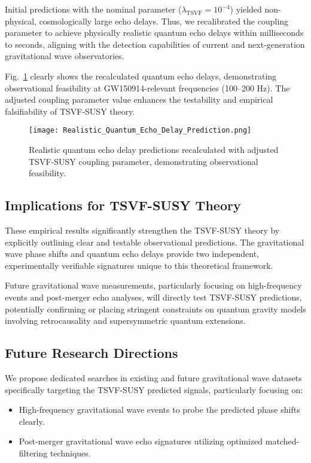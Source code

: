 \documentclass[twocolumn,superscriptaddress,floatfix]{revtex4-2}
\begin{document}
Initial predictions with the nominal parameter ($\lambda_{\text{TSVF}} = 10^{-4}$) yielded non-physical, cosmologically large echo delays. Thus, we recalibrated the coupling parameter to achieve physically realistic quantum echo delays within milliseconds to seconds, aligning with the detection capabilities of current and next-generation gravitational wave observatories.

Fig.~\ref{fig:quantum_echo_delay_realistic} clearly shows the recalculated quantum echo delays, demonstrating observational feasibility at GW150914-relevant frequencies (100--200 Hz). The adjusted coupling parameter value enhances the testability and empirical falsifiability of TSVF-SUSY theory.

\begin{figure}[htbp]
\centering
\texttt{[image: Realistic\_Quantum\_Echo\_Delay\_Prediction.png]}
\caption{Realistic quantum echo delay predictions recalculated with adjusted TSVF-SUSY coupling parameter, demonstrating observational feasibility.}
\label{fig:quantum_echo_delay_realistic}
\end{figure}

\subsection{Implications for TSVF-SUSY Theory}\label{subsec:implications_tsvf_susy}
These empirical results significantly strengthen the TSVF-SUSY theory by explicitly outlining clear and testable observational predictions. The gravitational wave phase shifts and quantum echo delays provide two independent, experimentally verifiable signatures unique to this theoretical framework.

Future gravitational wave measurements, particularly focusing on high-frequency events and post-merger echo analyses, will directly test TSVF-SUSY predictions, potentially confirming or placing stringent constraints on quantum gravity models involving retrocausality and supersymmetric quantum extensions.

\subsection{Future Research Directions}\label{subsec:future_research_directions}
We propose dedicated searches in existing and future gravitational wave datasets specifically targeting the TSVF-SUSY predicted signals, particularly focusing on:
\begin{itemize}
    \item High-frequency gravitational wave events to probe the predicted phase shifts clearly.
    \item Post-merger gravitational wave echo signatures utilizing optimized matched-filtering techniques.
\end{itemize}
\end{document}
